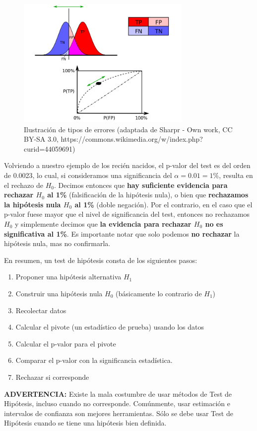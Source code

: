 \begin{figure}[h]
    \centering
    \includegraphics[trim = {0 300pt 0 0}, clip, width=0.75\textwidth]{img/ROC_curves.svg.png}
    \caption{Ilustración de tipos de errores (adaptada de Sharpr - Own work, CC BY-SA 3.0, https://commons.wikimedia.org/w/index.php?curid=44059691)}
    \label{fig:tipos_de_errore_TDH}
\end{figure}

Volviendo a nuestro ejemplo de los recién nacidos, el p-valor del test es del orden de 0.0023, lo cual, si consideramos una significancia del $\alpha=0.01=1\%$, resulta en el rechazo de $H_0$. Decimos entonces que \textbf{ hay suficiente evidencia para rechazar $H_0$ al 1\%}  (falsificación de la hipótesis nula), o bien que \textbf{ rechazamos la hipótesis nula $H_0$ al 1\%} (doble negación). Por el contrario, en el caso que el p-valor fuese mayor que el nivel de significancia del test, entonces no rechazamos $H_0$ y simplemente decimos que \textbf{ la evidencia para rechazar $H_0$ no es significativa al 1\%}. Es importante notar que solo podemos \textbf{no rechazar} la hipótesis nula, mas no confirmarla.


\begin{tcolorbox}[title=Test de Hipótesis]
En resumen,  un test de hipótesis consta de los siguientes pasos: 

\begin{enumerate}
	\item Proponer una hipótesis alternativa $H_1$
	\item Construir una hipótesis nula $H_0$ (básicamente lo contrario de $H_1$)
	\item Recolectar datos
	\item Calcular el pivote (un estadístico de prueba) usando los datos
	\item Calcular el p-valor para el pivote
	\item Comparar el p-valor con la significancia estadística. 
	\item Rechazar si corresponde
\end{enumerate}
\textbf{ADVERTENCIA: } Existe la mala costumbre de usar métodos de Test de Hipótesis, incluso cuando no corresponde. Comúnmente, usar estimación e intervalos de confianza son mejores herramientas. Sólo se debe usar Test de Hipótesis cuando se tiene una hipótesis bien definida.
\end{tcolorbox}

